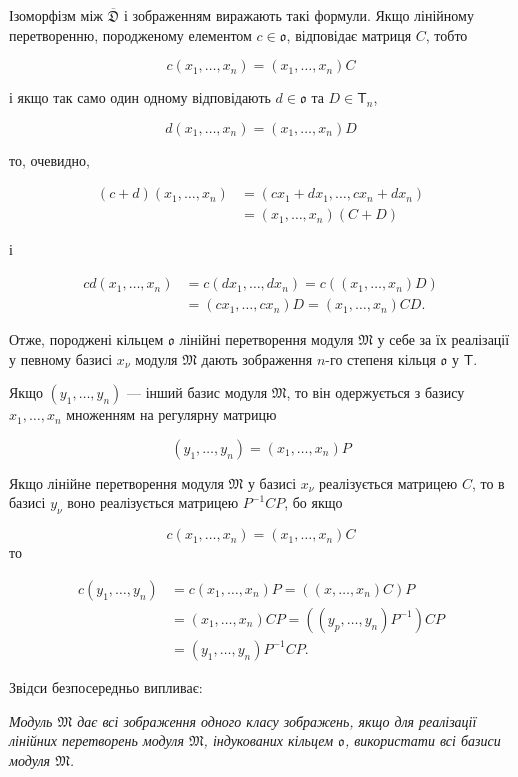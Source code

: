 \documentclass[11pt]{article}
\begin{document}
Ізоморфізм між \(\overline{\mathfrak D}\) і зображенням виражають такі формули. Якщо лінійному перетворенню, породженому елементом \(c\in\mathfrak{o}\), відповідає матриця \(C\), тобто

\[
c(x_1,\ldots,x_n)=(x_1,\ldots,x_n)C
\]

і якщо так само один одному відповідають \(d\in\mathfrak{o}\) та \(D\in\mathsf T_n\),

\[
d(x_1,\ldots,x_n)=(x_1,\ldots,x_n)D
\]

то, очевидно,

\[
\begin{aligned}
(c+d)(x_1,\ldots,x_n)
&=(cx_1+dx_1,\ldots,cx_n+dx_n)\\
&=(x_1,\ldots,x_n)(C+D)
\end{aligned}
\]

і

\[
\begin{aligned}
cd(x_1,\ldots,x_n)
&=c(dx_1,\ldots,dx_n)=c((x_1,\ldots,x_n)D)\\
&=(cx_1,\ldots,cx_n)D=(x_1,\ldots,x_n)CD.
\end{aligned}
\]

Отже, породжені кільцем \(\mathfrak{o}\) лінійні перетворення модуля \(\mathfrak M\) у себе за їх реалізації у певному базисі \(x_\nu\) модуля \(\mathfrak M\) дають зображення \(n\)-го степеня кільця \(\mathfrak{o}\) у \(\mathsf T\).

Якщо \((y_1,\ldots,y_n)\) --- інший базис модуля \(\mathfrak M\), то він одержується з базису \(x_1,\ldots,x_n\) множенням на регулярну матрицю

\[(y_1,\ldots,y_n)=(x_1,\ldots,x_n)P\]

Якщо лінійне перетворення модуля \(\mathfrak M\) у базисі \(x_\nu\) реалізується матрицею \(C\), то в базисі \(y_\nu\) воно реалізується матрицею \(P^{-1}CP\), бо якщо

\[c(x_1,\ldots,x_n)=(x_1,\ldots,x_n)C\]
то

\[
\begin{aligned}
c(y_1,\ldots,y_n)
&=c(x_1,\ldots,x_n)P=((x,\ldots,x_n)C)P\\
&=(x_1,\ldots,x_n)CP=((y_p,\ldots,y_n)P^{-1})CP\\
&=(y_1,\ldots,y_n)P^{-1}CP.
\end{aligned}
\]

Звідси безпосередньо випливає:

\emph{Модуль \(\mathfrak M\) дає всі зображення одного класу зображень, якщо для реалізації лінійних перетворень модуля \(\mathfrak M\), індукованих кільцем \(\mathfrak{o}\), використати всі базиси модуля \(\mathfrak M\).}
\end{document}
